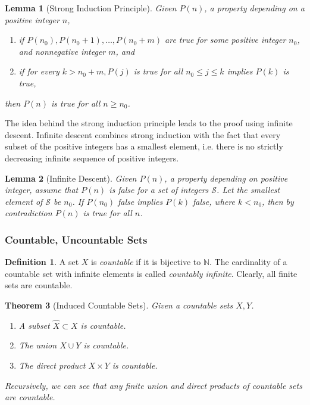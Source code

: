 \documentclass{article}
\newtheorem{theorem}{Theorem}[section]
\newtheorem{lemma}[theorem]{Lemma}
\theoremstyle{remark}
\theoremstyle{definition}
\newtheorem{definition}{Definition}[section]
\begin{document}
\begin{lemma}[Strong Induction Principle]
Given $P(n)$, a property depending on a positive integer $n$, 
\begin{enumerate}
    \item if $P(n_0), P(n_0 + 1), \ldots, P(n_0 + m)$ are true for some positive integer $n_0$, and nonnegative integer $m$, and 
    \item if for every $k > n_0 + m, P(j)$ is true for all $n_0 \leq j \leq k$ implies $P(k)$ is true, 
\end{enumerate}
then $P(n)$ is true for all $n \geq n_0$. 
\end{lemma}

The idea behind the strong induction principle leads to the proof using infinite descent. Infinite descent combines strong induction with the fact that every subset of the positive integers has a smallest element, i.e. there is no strictly decreasing infinite sequence of positive integers. 

\begin{lemma}[Infinite Descent]
Given $P(n)$, a property depending on positive integer, assume that $P(n)$ is false for a set of integers $\mathcal{S}$. Let the smallest element of $\mathcal{S}$ be $n_0$. If $P(n_0)$ false implies $P(k)$ false, where $k < n_0$, then by contradiction $P(n)$ is true for all $n$. 
\end{lemma}

\subsubsection{Countable, Uncountable Sets}
\begin{definition}
A set $X$ is \textit{countable} if it is bijective to $\mathbb{N}$. The cardinality of a countable set with infinite elements is called \textit{countably infinite}. Clearly, all finite sets are countable. 
\end{definition}

\begin{theorem}[Induced Countable Sets]
Given a countable sets $X, Y$. 
\begin{enumerate}
    \item A subset $\hat{X} \subset X$ is countable. 
    \item The union $X \cup Y$ is countable. 
    \item The direct product $X \times Y$ is countable. 
\end{enumerate}
Recursively, we can see that any finite union and direct products of countable sets are countable. 
\end{theorem}
\end{document}
